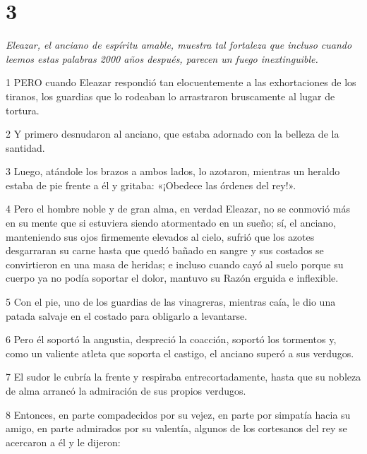 \chapter{3}

\par \textit{Eleazar, el anciano de espíritu amable, muestra tal fortaleza que incluso cuando leemos estas palabras 2000 años después, parecen un fuego inextinguible.}

\par 1 PERO cuando Eleazar respondió tan elocuentemente a las exhortaciones de los tiranos, los guardias que lo rodeaban lo arrastraron bruscamente al lugar de tortura.

\par 2 Y primero desnudaron al anciano, que estaba adornado con la belleza de la santidad.

\par 3 Luego, atándole los brazos a ambos lados, lo azotaron, mientras un heraldo estaba de pie frente a él y gritaba: «¡Obedece las órdenes del rey!».

\par 4 Pero el hombre noble y de gran alma, en verdad Eleazar, no se conmovió más en su mente que si estuviera siendo atormentado en un sueño; sí, el anciano, manteniendo sus ojos firmemente elevados al cielo, sufrió que los azotes desgarraran su carne hasta que quedó bañado en sangre y sus costados se convirtieron en una masa de heridas; e incluso cuando cayó al suelo porque su cuerpo ya no podía soportar el dolor, mantuvo su Razón erguida e inflexible.

\par 5 Con el pie, uno de los guardias de las vinagreras, mientras caía, le dio una patada salvaje en el costado para obligarlo a levantarse.

\par 6 Pero él soportó la angustia, despreció la coacción, soportó los tormentos y, como un valiente atleta que soporta el castigo, el anciano superó a sus verdugos.

\par 7 El sudor le cubría la frente y respiraba entrecortadamente, hasta que su nobleza de alma arrancó la admiración de sus propios verdugos.

\par 8 Entonces, en parte compadecidos por su vejez, en parte por simpatía hacia su amigo, en parte admirados por su valentía, algunos de los cortesanos del rey se acercaron a él y le dijeron:

